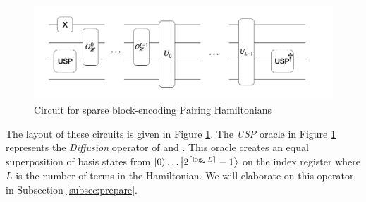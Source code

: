 \begin{figure}[h]
    \includegraphics[width = \linewidth]{figures/SBE.png}
    \caption{Circuit for sparse block-encoding Pairing Hamiltonians}
    \label{fig:sbe}
\end{figure}

The layout of these circuits is given in Figure \ref{fig:sbe}.
The \textit{USP} oracle in Figure \ref{fig:sbe} represents the \textit{Diffusion} operator of \cite{camps2024explicit} and \cite{liu2024efficient}.
This oracle creates an equal superposition of basis states from $\ket{0}\dots \ket{2^{\lceil \log_2{L} \rceil} - 1}$ on the index register where $L$ is the number of terms in the Hamiltonian.
We will elaborate on this operator in Subsection \ref{subsec:prepare}.

